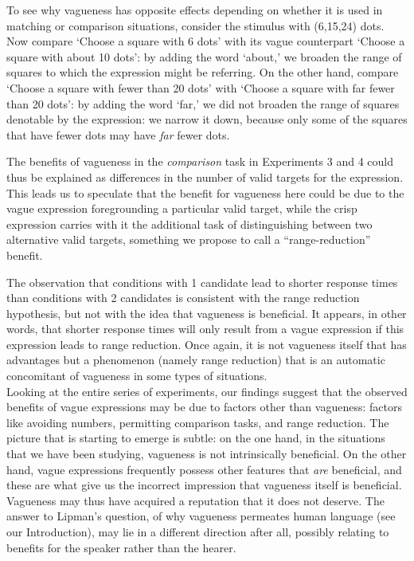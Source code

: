 \documentclass[ %
  graybox       %
 ,envcountchap  %
 ,sectrefs      %
]{svmono}
\begin{document}
To see why vagueness has opposite effects depending on whether it is used in matching or comparison situations, consider the stimulus with (6,15,24) dots. Now compare `Choose a square with 6 dots' with its vague counterpart `Choose a square with about 10 dots': by adding the word `about,' we broaden the range of squares to which the expression might be referring. On the other hand, compare `Choose a square with fewer than 20 dots' with `Choose a square with far fewer than 20 dots': by adding the word `far,' we did not broaden the range of squares denotable by the expression: we narrow it down, because only some of the squares that have fewer dots may have {\em far} fewer dots.

The benefits of vagueness in the \emph{comparison} task in Experiments 3 and 4 could thus be explained as differences in the number of valid targets for the expression. This leads us to speculate that the benefit for vagueness here could be due to the vague expression foregrounding a particular valid target, while the crisp expression carries with it the additional task of distinguishing between two alternative valid targets, something we propose to call a ``range-reduction'' benefit.

The observation that conditions with 1 candidate lead to shorter response times than conditions with 2 candidates is consistent with the range reduction hypothesis, but not with the idea that vagueness is beneficial. It appears, in other words, that shorter response times will only result from a vague expression if this expression leads to range reduction. Once again, it is not vagueness itself that has advantages but a phenomenon (namely range reduction) that is an automatic concomitant of vagueness in some types of situations.\\[2ex]
%
Looking at the entire series of experiments, our findings suggest that the observed benefits of vague expressions may be due to factors other than vagueness: factors like avoiding numbers, permitting comparison tasks, and range reduction. The picture that is starting to emerge is subtle: on the one hand, in the situations that we have been studying, vagueness is not intrinsically beneficial. On the other hand, vague expressions frequently possess other features that \emph{are} beneficial, and these are what give us the incorrect impression that vagueness itself is beneficial. Vagueness may thus have acquired a reputation that it does not deserve. The answer to Lipman's question, of why vagueness permeates human language (see our Introduction), may lie in a different direction after all, possibly relating to benefits for the speaker rather than the hearer.
\end{document}
